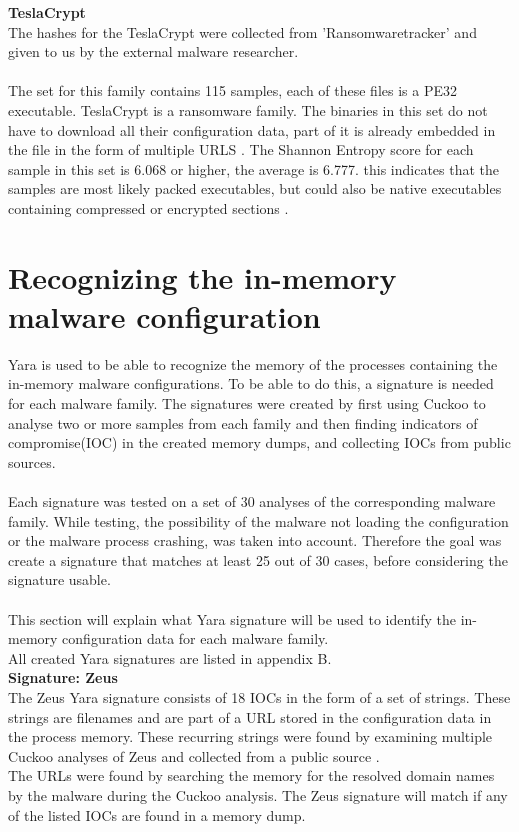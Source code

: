 \documentclass[conference]{IEEEtran}
\begin{document}
\textbf{TeslaCrypt}\\
The hashes for the TeslaCrypt were collected from 'Ransomwaretracker' and given to us by the external malware researcher. \\\\The set for this family contains 115 samples, each of these files is a PE32 executable. TeslaCrypt is a ransomware family. The binaries in this set do not have to download all their \Gls{configuration data}, part of it is already embedded in the file in the form of  multiple URLS \cite{wyke-currans}. The Shannon Entropy score for each sample in this set is 6.068 or higher, the average is 6.777. this indicates that the samples are most likely packed executables, but could also be native executables containing compressed or encrypted sections \cite{hamrock-entropy}.

\section{Recognizing the in-memory malware configuration}
Yara is used to be able to recognize the memory of the processes containing the in-memory malware configurations. To be able to do this, a signature is needed for each malware family. The signatures were created by first using Cuckoo to analyse two or more samples from each family and then finding indicators of compromise(\Gls{IOC}) in the created memory dumps, and collecting \Gls{IOC}s from public sources. \\\\Each signature was tested on a set of 30 analyses of the corresponding malware family. While testing, the possibility of the malware not loading the configuration or the malware process crashing, was taken into account. Therefore the goal was create a signature that matches at least 25 out of 30 cases, before considering the signature usable. \\\\This section will explain what Yara signature will be used to identify the in-memory \Gls{configuration data} for each malware family.\\ All created Yara signatures are listed in appendix B.\\

\textbf{Signature: Zeus}
\\The Zeus Yara signature consists of 18 \Gls{IOC}s in the form of a set of strings. These strings are filenames and are part of a URL stored in the \Gls{configuration data} in the process memory. These recurring strings were found by examining multiple Cuckoo analyses of Zeus and collected from a public source \cite{zeus-ioc}.\\The URLs were found by searching the memory for the resolved domain names by the malware during the Cuckoo analysis. The Zeus signature will match if any of the listed \Gls{IOC}s are found in a memory dump.\\
\end{document}
